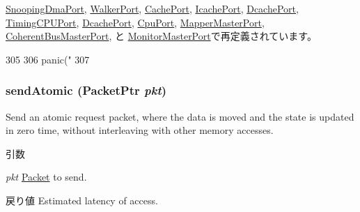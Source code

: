 \hyperlink{classArmISA_1_1TableWalker_1_1SnoopingDmaPort_ae43c73eff109f907118829fcfa9e7096}{SnoopingDmaPort}, \hyperlink{classX86ISA_1_1Walker_1_1WalkerPort_aff3031c56fc4947a19695c868bb8233e}{WalkerPort}, \hyperlink{classInOrderCPU_1_1CachePort_aff3031c56fc4947a19695c868bb8233e}{CachePort}, \hyperlink{classFullO3CPU_1_1IcachePort_ae43c73eff109f907118829fcfa9e7096}{IcachePort}, \hyperlink{classFullO3CPU_1_1DcachePort_aff3031c56fc4947a19695c868bb8233e}{DcachePort}, \hyperlink{classTimingSimpleCPU_1_1TimingCPUPort_ae43c73eff109f907118829fcfa9e7096}{TimingCPUPort}, \hyperlink{classTimingSimpleCPU_1_1DcachePort_aff3031c56fc4947a19695c868bb8233e}{DcachePort}, \hyperlink{classMemTest_1_1CpuPort_ae43c73eff109f907118829fcfa9e7096}{CpuPort}, \hyperlink{classAddrMapper_1_1MapperMasterPort_aff3031c56fc4947a19695c868bb8233e}{MapperMasterPort}, \hyperlink{classCoherentBus_1_1CoherentBusMasterPort_ae43c73eff109f907118829fcfa9e7096}{CoherentBusMasterPort}, と \hyperlink{classCommMonitor_1_1MonitorMasterPort_aff3031c56fc4947a19695c868bb8233e}{MonitorMasterPort}で再定義されています。


\begin{DoxyCode}
305     {
306         panic("%
307     }
\end{DoxyCode}
\hypertarget{classMasterPort_a49fe5ebde5a0349bff76527b969b7643}{
\subsubsection[{sendAtomic}]{ sendAtomic ({\bf PacketPtr} {\em pkt})}}
\label{classMasterPort_a49fe5ebde5a0349bff76527b969b7643}
Send an atomic request packet, where the data is moved and the state is updated in zero time, without interleaving with other memory accesses.


\begin{DoxyParams}{引数}
\item[{\em pkt}]\hyperlink{classPacket}{Packet} to send.\end{DoxyParams}
\begin{DoxyReturn}{戻り値}
Estimated latency of access. 
\end{DoxyReturn}



